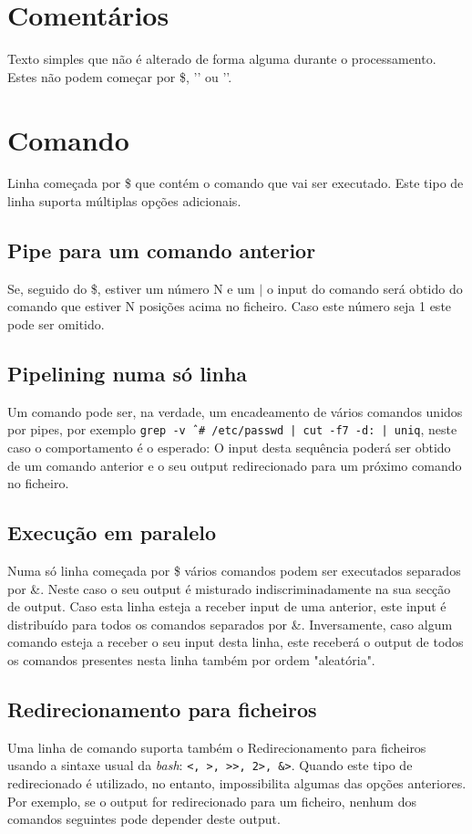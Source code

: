 \documentclass[12pt,a4paper]{report}
\begin{document}
    \section{Comentários}
        Texto simples que não é alterado de forma alguma durante o
        processamento. Estes não podem começar por \$, '\outputStart' ou
        '\outputEnd'.
    \section{Comando}
        Linha começada por \$ que contém o comando que vai ser executado.
        Este tipo de linha suporta múltiplas opções adicionais.
        \subsection{Pipe para um comando anterior}
            Se, seguido do \$, estiver um número N e um $|$ o input do comando
            será obtido do comando que estiver N posições acima no ficheiro.
            Caso este número seja 1 este pode ser omitido.
        \subsection{Pipelining numa só linha}
            Um comando pode ser, na verdade, um encadeamento de vários comandos
            unidos por pipes, por exemplo
            \texttt{grep -v ˆ# /etc/passwd | cut -f7 -d: | uniq},
            neste caso o comportamento é o esperado: O input desta sequência
            poderá ser obtido de um comando anterior e o seu output
            redirecionado para um próximo comando no ficheiro.
        \subsection{Execução em paralelo}
            Numa só linha começada por \$ vários comandos podem ser executados
            separados por \&. Neste caso o seu output é misturado
            indiscriminadamente na sua secção de output. Caso esta linha esteja
            a receber input de uma anterior, este input é distribuído para
            todos os comandos separados por \&. Inversamente, caso algum
            comando esteja a receber o seu input desta linha, este receberá
            o output de todos os comandos presentes nesta linha também por
            ordem "aleatória".
        \subsection{Redirecionamento para ficheiros}
            Uma linha de comando suporta também o Redirecionamento para
            ficheiros usando a sintaxe usual da \textit{bash}:
            \texttt{<, >, >>, 2>, &>}.
            Quando este tipo de redirecionado é utilizado, no entanto,
            impossibilita algumas das opções anteriores. Por exemplo,
            se o output for redirecionado para um ficheiro, nenhum dos comandos
            seguintes pode depender deste output.
\end{document}

